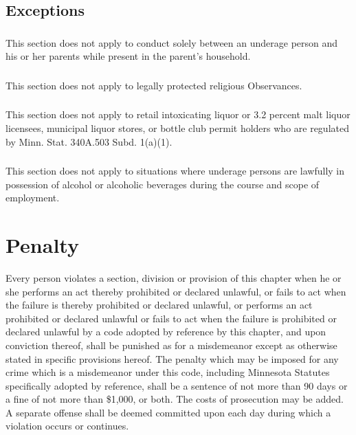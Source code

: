 \subsection{Exceptions}
\subsubsection{}
This section does not apply to conduct solely between an underage person and his or her parents while present in the parent’s household.
\subsubsection{}
This section does not apply to legally protected religious Observances.
\subsubsection{}
This section does not apply to retail intoxicating liquor or 3.2 percent malt liquor licensees, municipal liquor stores, or bottle club permit holders who are regulated by Minn. Stat. \textsection 340A.503 Subd. 1(a)(1).
\subsubsection{}
This section does not apply to situations where underage persons are lawfully in possession of alcohol or alcoholic beverages during the course and scope of employment.

\setcounter{section}{98}
\section{Penalty}
Every person violates a section, division or provision of this chapter when he or she performs an act thereby prohibited or declared unlawful, or fails to act when the failure is thereby prohibited or declared unlawful, or performs an act prohibited or declared unlawful or fails to act when the failure is prohibited or declared unlawful by a code adopted by reference by this chapter, and upon conviction thereof, shall be punished as for a misdemeanor except as otherwise stated in specific provisions hereof. The penalty which may be imposed for any crime which is a misdemeanor under this code, including Minnesota Statutes specifically adopted by reference, shall be a sentence of not more than 90 days or a fine of not more than \$1,000, or both. The costs of prosecution may be added. A separate offense shall be deemed committed upon each day during which a violation occurs or continues.
